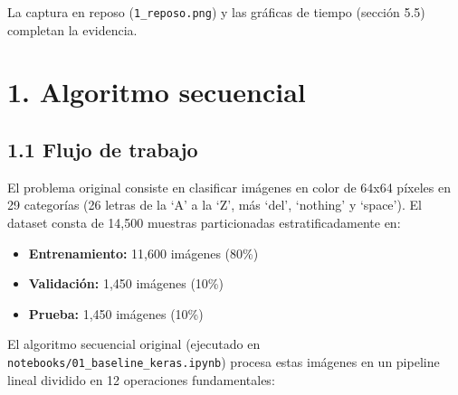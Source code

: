 \documentclass[
  11pt,
]{article}
\providecommand{\tightlist}{%
  \setlength{\itemsep}{0pt}\setlength{\parskip}{0pt}}
\begin{document}
La captura en reposo (\texttt{1\_reposo.png}) y las gráficas de tiempo (sección 5.5) completan la evidencia.

\clearpage
\section{1. Algoritmo secuencial}\label{anuxe1lisis-del-algoritmo-secuencial-paso-1}

\subsection{1.1 Flujo de trabajo}\label{descripciuxf3n-del-algoritmo-y-flujo-de-trabajo}

El problema original consiste en clasificar imágenes en
color de 64x64 píxeles en 29 categorías (26 letras de la `A'
a la `Z', más `del', `nothing' y `space'). El dataset consta
de 14,500 muestras particionadas estratificadamente en:

\begin{itemize}
\tightlist
\item
  \textbf{Entrenamiento:} 11,600 imágenes (80\%)
\item
  \textbf{Validación:} 1,450 imágenes (10\%)
\item
  \textbf{Prueba:} 1,450 imágenes (10\%)
\end{itemize}

El algoritmo secuencial original (ejecutado en
\texttt{notebooks/01\_baseline\_keras.ipynb}) procesa estas
imágenes en un pipeline lineal dividido en 12 operaciones
fundamentales:
\end{document}
